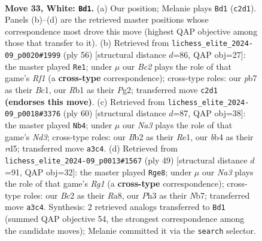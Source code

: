 \documentclass[11pt]{article}
\begin{document}
\clearpage

\begin{figure}[p]\centering
\begin{subfigure}{0.46\textwidth}\centering
\resizebox{\linewidth}{!}{%
\newchessgame
\chessboard[
  setfen={1nb5/rp1n2k1/5p2/p2p2p1/1b4Pp/NP2P2P/PBB1PK2/1R6 w - - 0 33},
  showmover=false,
  pgfstyle=straightmove, color=movearrow, markmove={c2-d1}
]}
\caption{}
\end{subfigure}\hfill
\begin{subfigure}{0.46\textwidth}\centering
\resizebox{\linewidth}{!}{%
\newchessgame
\chessboard[
  setfen={3rn3/p1p1b1k1/1p2bp2/6p1/P2PN2p/2PB4/1P4PP/2B2RK1 w - - 8 29},
  showmover=false,
  pgfstyle=straightmove, color=movearrow, markmove={f1-e1}
]}
\caption{}
\end{subfigure}
\\[4pt]
\begin{subfigure}{0.46\textwidth}\centering
\resizebox{\linewidth}{!}{%
\newchessgame
\chessboard[
  setfen={8/p1k1n3/5b1p/1p1rpppP/8/P1PN1P2/1PK3P1/2B1R3 w - - 0 31},
  showmover=false,
  pgfstyle=straightmove, color=movearrow, markmove={d3-b4}
]}
\caption{}
\end{subfigure}\hfill
\begin{subfigure}{0.46\textwidth}\centering
\resizebox{\linewidth}{!}{%
\newchessgame
\chessboard[
  setfen={r5r1/1n1k1p1B/ppb1pB2/2p1P3/8/2N2P2/PPP1NK1P/7R b - - 0 25},
  showmover=false,
  pgfstyle=straightmove, color=movearrow, markmove={g8-e8}
]}
\caption{}
\end{subfigure}
\caption{\textbf{Move 33, White: \texttt{Bd1}.} (a) Our position; Melanie plays \texttt{Bd1} (\texttt{c2d1}). Panels (b)--(d) are the retrieved master positions whose correspondence most drove this move (highest QAP objective among those that transfer to it). (b) Retrieved from \texttt{lichess\_elite\_2024-09\_p0020\#1999} (ply 56) [structural distance $d$=86, QAP obj=27]: the master played \texttt{Re1}; under $\mu$ our \emph{Bc2} plays the role of that game's \emph{Rf1} (a \textbf{cross-type} correspondence); cross-type roles: our \emph{p}b7 as their \emph{B}c1, our \emph{R}b1 as their \emph{P}g2; transferred move \texttt{c2d1} \textbf{(endorses this move)}. (c) Retrieved from \texttt{lichess\_elite\_2024-09\_p0018\#3376} (ply 60) [structural distance $d$=87, QAP obj=38]: the master played \texttt{Nb4}; under $\mu$ our \emph{Na3} plays the role of that game's \emph{Nd3}; cross-type roles: our \emph{B}b2 as their \emph{R}e1, our \emph{b}b4 as their \emph{r}d5; transferred move \texttt{a3c4}. (d) Retrieved from \texttt{lichess\_elite\_2024-09\_p0013\#1567} (ply 49) [structural distance $d$=91, QAP obj=32]: the master played \texttt{Rge8}; under $\mu$ our \emph{Na3} plays the role of that game's \emph{Rg1} (a \textbf{cross-type} correspondence); cross-type roles: our \emph{B}c2 as their \emph{R}a8, our \emph{P}h3 as their \emph{N}b7; transferred move \texttt{a3c4}. Synthesis: 2 retrieved analogs transferred to \texttt{Bd1} (summed QAP objective 54, the strongest correspondence among the candidate moves); Melanie committed it via the \texttt{search} selector.}
\label{fig:thought-m64}
\end{figure}
\end{document}
